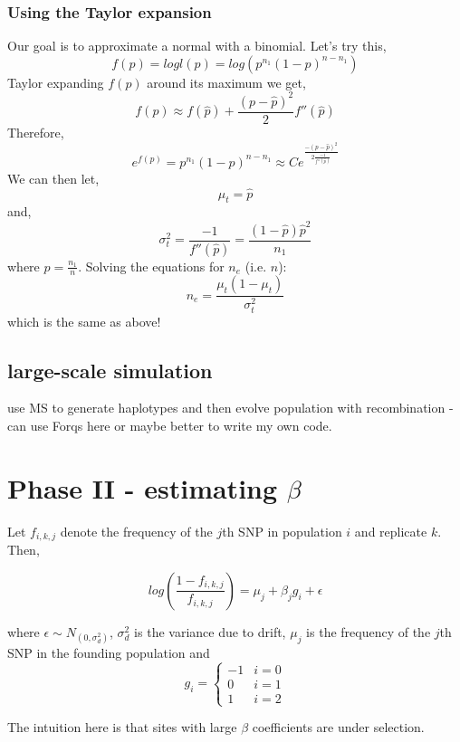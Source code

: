 \documentclass[10pt,a4paper,draft]{article}
\begin{document}
\subsubsection{Using the Taylor expansion}
Our goal is to approximate a normal with a binomial. Let's try this,
\begin{equation}
f(p) = logl(p) = log(p^{n_1}(1-p)^{n-n_1})
\end{equation}
Taylor expanding $f(p)$ around its maximum we get,
\begin{equation}
f(p) \approx f(\hat{p}) + \frac{(p-\hat{p})^2}{2}f''(\hat{p})
\end{equation}
Therefore,
\begin{equation}
e^{f(p)} = p^{n_1}(1-p)^{n-n_1} \approx Ce^{\frac{-(p-\hat{p})^2}{2\frac{-1}{f''(\hat{p})}}}
\end{equation}
We can then let,
\begin{equation}
 \mu_t = \hat{p} 
\end{equation}
and,
\begin{equation}
 \sigma_t^2  = \frac{-1}{f''(\hat{p})} =\frac{(1-\hat{p})\hat{p}^2}{n_1}
\end{equation}
where $\hat{p} = \frac{n_1}{n}$.
Solving the equations for $n_e$ (i.e. $n$):
\begin{equation}
n_e = \frac{\mu_t(1-\mu_t)}{\sigma_t^2}
\end{equation} 
which is the same as above!

\subsection{large-scale simulation}
use MS to generate haplotypes and then evolve population with recombination - can use Forqs here or maybe better to write my own code.

\section{Phase II - estimating $\beta$}
Let $f_{i,k,j}$ denote the frequency of the $j$th SNP in population $i$ and replicate $k$. Then,

\begin{equation}
log(\frac{1-f_{i,k,j}}{f_{i,k,j}}) = \mu_j + \beta_{j} g_i + \epsilon
\end{equation}

where $\epsilon \sim N_(0, \sigma_d^2)$, $\sigma_d^2$ is the variance due to drift, $\mu_j$ is the frequency of the $j$th SNP in the founding population and 
\[
   g_{i} = \left\{
     \begin{array}{lr}
       -1 &  i =0\\
        0 &  i =1 \\
        1 &  i =2
     \end{array}
   \right.
\]

The intuition here is that sites with large $\beta$ coefficients are under selection.
\end{document}
